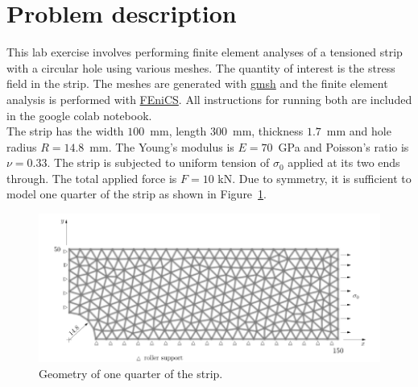 \documentclass[11pt,a4paper]{article}
\begin{document}


%
\section{Problem description \label{s:problem}}
%
This lab exercise involves performing finite element analyses of a tensioned strip with a circular hole using various meshes. The quantity of interest is the stress field in the strip. The meshes are generated with \href{https://gmsh.info/}{gmsh} and the finite element analysis is performed with \href{https://fenicsproject.org/}{FEniCS}.  All instructions for running both are included in the google colab notebook.  \\

\noindent
The strip has the width $100$~mm, length $300$~mm, thickness $1.7$~mm and  hole radius $R = 14.8$~mm. The Young's modulus is $E = 70$~GPa and Poisson's ratio is $\nu = 0.33$. The strip is subjected to uniform tension of $\sigma_0$ applied at its two ends through. The total applied force is $F=10$ kN. Due to symmetry, it is sufficient to model one quarter of the strip as shown in Figure~\ref{fig-geometry}. 


\begin{figure}[htb]
    \centering
     \includegraphics[width=400pt]{figs/dessin.pdf}	
    \caption{Geometry of one quarter of the strip.}
    \label{fig-geometry}
\end{figure}
\end{document}
